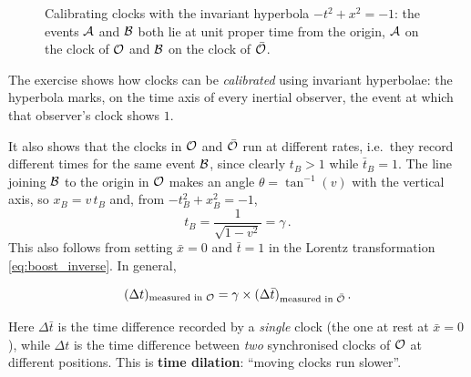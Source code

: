 \begin{figure}[H]
    \centering
    \caption{Calibrating clocks with the invariant hyperbola $-t^2 + x^2 = -1$: the events
        $\mathcal{A}$ and $\mathcal{B}$ both lie at unit proper time from the origin, $\mathcal{A}$ on the clock
        of $\mathcal{O}$ and $\mathcal{B}$ on the clock of $\bar{\mathcal{O}}$.}
    \label{fig:time_dilation}
\end{figure}

The exercise shows how clocks can be \emph{calibrated} using invariant hyperbolae: the hyperbola
marks, on the time axis of every inertial observer, the event at which that observer's clock
shows $1$.

It also shows that the clocks in $\mathcal{O}$ and $\bar{\mathcal{O}}$ run at different rates, i.e.\ they record
different times for the same event $\mathcal{B}$, since clearly $t_B > 1$ while $\bar{t}_B = 1$. The
line joining $\mathcal{B}$ to the origin in $\mathcal{O}$ makes an angle $\theta = \tan^{-1}(v)$ with the
vertical axis, so $x_B = v\,t_B$ and, from $-t_B^2 + x_B^2 = -1$,
\begin{equation}
    t_B = \frac{1}{\sqrt{1 - v^2}} = \gamma \, .
\end{equation}
This also follows from setting $\bar{x} = 0$ and $\bar{t} = 1$ in the Lorentz transformation
\eqref{eq:boost_inverse}. In general,
\begin{keyresult}
    \begin{equation}
        (\Delta t)_{\text{measured in } \mathcal{O}} = \gamma \times (\Delta \bar{t})_{\text{measured in } \bar{\mathcal{O}}} \, .
        \label{eq:time_dilation}
    \end{equation}
\end{keyresult}
Here $\Delta\bar{t}$ is the time difference recorded by a \emph{single} clock (the one at rest at
$\bar{x} = 0$), while $\Delta t$ is the time difference between \emph{two} synchronised clocks of
$\mathcal{O}$ at different positions. This is \textbf{time dilation}: ``moving clocks run slower''.

